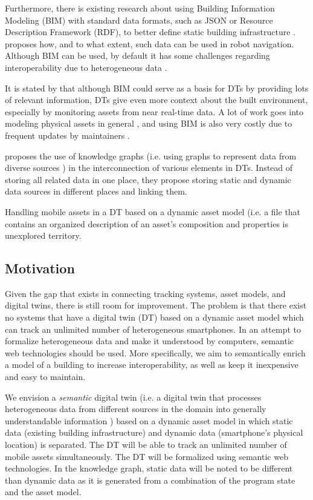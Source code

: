 \documentclass{article}
\begin{document}
Furthermore, there is existing research about using Building Information Modeling (BIM) with standard data formats, such as JSON or Resource Description Framework (RDF), to better define static building infrastructure \cite{pauwels_live_2023}. \citeauthor{pauwels_live_2023} proposes how, and to what extent, such data can be used in robot navigation. Although BIM can be used, by default it has some challenges regarding interoperability due to heterogeneous data \cite{dinis_bim_2022,godager_concept_2021}. 

It is stated by \citeauthor{godager_concept_2021} that although BIM could serve as a basis for DTs by providing lots of relevant information, DTs give even more context about the built environment, especially by monitoring assets from near real-time data. A lot of work goes into modeling physical assets in general \cite{waszak_let_2022}, and using BIM is also very costly due to frequent updates by maintainers \cite{hamledari_ifc-based_2018}.

\citeauthor{waszak_let_2022} proposes the use of knowledge graphs (i.e. using graphs to represent data from diverse sources \cite{hogan_introduction_2022, ryen_building_2022}) in the interconnection of various elements in DTs. Instead of storing all related data in one place, they propose storing static and dynamic data sources in different places and linking them.

Handling mobile assets in a DT based on a dynamic asset model (i.e. a file that contains an organized description of an asset's composition and properties \cite{kamburjan_twinning-by-construction_2022} is unexplored territory.


\subsection{Motivation}
Given the gap that exists in connecting tracking systems, asset models, and digital twins, there is still room for improvement. The problem is that there exist no systems that have a digital twin (DT) based on a dynamic asset model which can track an unlimited number of heterogeneous smartphones. In an attempt to formalize heterogeneous data and make it understood by computers, semantic web technologies should be used. More specifically, we aim to semantically enrich a model of a building to increase interoperability, as well as keep it inexpensive and easy to maintain.

We envision a \emph{semantic} digital twin (i.e. a digital twin that processes heterogeneous data from different sources in the domain into generally understandable information \cite{birgit_boss_digital_nodate}) based on a dynamic asset model in which static data (existing building infrastructure) and dynamic data (smartphone's physical location) is separated. The DT will be able to track an unlimited number of mobile assets simultaneously. The DT will be formalized using semantic web technologies. In the knowledge graph, static data will be noted to be different than dynamic data as it is generated from a combination of the program state and the asset model. 
\end{document}
